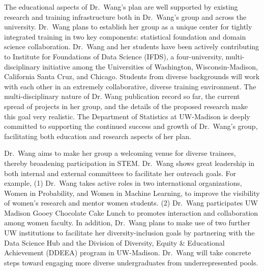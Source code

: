 \documentclass{article}
\begin{document}
The educational aspects of Dr.\ Wang's plan are well supported by existing research and training infrastructure both in Dr.\ Wang's group and across the university. Dr.\ Wang plans to establish her group as a unique center for tightly integrated training in two key components: statistical foundation and domain science collaboration. Dr.\ Wang and her students have been actively contributing to Institute for Foundations of Data Science (IFDS), a four-university, multi-disciplinary initiative among the Universities of Washington, Wisconsin-Madison, California Santa Cruz, and Chicago. Students from diverse backgrounds will work with each other in an extremely collaborative, diverse training environment. The multi-disciplinary nature of Dr. Wang publication record so far, the current spread of projects in her group, and the details of the proposed research make this goal very realistic. The Department of Statistics at UW-Madison is deeply committed to supporting the continued success and growth of Dr.\ Wang’s group, facilitating both education and research aspects of her plan.

Dr.\ Wang aims to make her group a welcoming venue for diverse trainees, thereby broadening participation in STEM. Dr.\ Wang shows great leadership in both internal and external committees to facilitate her outreach goals. For example, (1) Dr.\ Wang takes active roles in two international organizations, Women in Probability, and Women in Machine Learning, to improve the visibility of women’s research and mentor women students. (2) Dr.\ Wang participates UW Madison Gooey Chocolate Cake Lunch to promotes interaction and collaboration among women faculty. In addition, Dr.\ Wang plans to make use of two further UW institutions to facilitate her diversity-inclusion goals by partnering with the Data Science Hub and the Division of Diversity, Equity \& Educational Achievement (DDEEA) program in UW-Madison. Dr.\ Wang will take concrete steps toward engaging more diverse undergraduates from underrepresented pools.  
\end{document}
